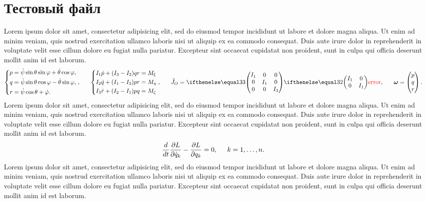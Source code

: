 \section{Тестовый файл}


Lorem ipsum dolor sit amet, consectetur adipisicing elit, sed do eiusmod
tempor incididunt ut labore et dolore magna aliqua. Ut enim ad minim veniam,
quis nostrud exercitation ullamco laboris nisi ut aliquip ex ea commodo
consequat. Duis aute irure dolor in reprehenderit in voluptate velit esse
cillum dolore eu fugiat nulla pariatur. Excepteur sint occaecat cupidatat non
proident, sunt in culpa qui officia deserunt mollit anim id est laborum.
\begin{equation*}
    \left\{\begin{aligned}
        p &= \dot{\psi} \sin \theta \sin \varphi + \dot{\theta} \cos \varphi,\\
        q &= \dot{\psi} \sin \theta \cos \varphi - \dot{\theta} \sin \varphi,\\
        r &= \dot{\psi} \cos \theta + \dot{\varphi}.
    \end{aligned}\right.,
    \hspace{0.6cm} 
    \left\{\begin{aligned}
        I_1 \dot{p} + (I_3-I_2) q r &= M_{\xi} \\
        I_2 \dot{q} + (I_1-I_3) p r &= M_{\eta} \\
        I_3 \dot{r} + (I_2-I_1) p q &= M_{\zeta} \\
    \end{aligned}\right.,   
    \hspace{0.6cm} 
    \hat{J}_O = \dmat{3}{I_1}{I_1}{I_3}, \hspace{0.6cm} 
    \vc{\omega} = \begin{pmatrix}
        p \\ q \\ r
    \end{pmatrix}.
\end{equation*}
Lorem ipsum dolor sit amet, consectetur adipisicing elit, sed do eiusmod
tempor incididunt ut labore et dolore magna aliqua. Ut enim ad minim veniam,
quis nostrud exercitation ullamco laboris nisi ut aliquip ex ea commodo
consequat. Duis aute irure dolor in reprehenderit in voluptate velit esse
cillum dolore eu fugiat nulla pariatur. Excepteur sint occaecat cupidatat non
proident, sunt in culpa qui officia deserunt mollit anim id est laborum.
\begin{equation*}
    \frac{d}{dt} \frac{\partial L}{\partial \dot{q}_k} - \frac{\partial L}{\partial q_k} = 0, \hspace{0.5cm} k = 1, \ldots, n.
\end{equation*}
Lorem ipsum dolor sit amet, consectetur adipisicing elit, sed do eiusmod
tempor incididunt ut labore et dolore magna aliqua. Ut enim ad minim veniam,
quis nostrud exercitation ullamco laboris nisi ut aliquip ex ea commodo
consequat. Duis aute irure dolor in reprehenderit in voluptate velit esse
cillum dolore eu fugiat nulla pariatur. Excepteur sint occaecat cupidatat non
proident, sunt in culpa qui officia deserunt mollit anim id est laborum.